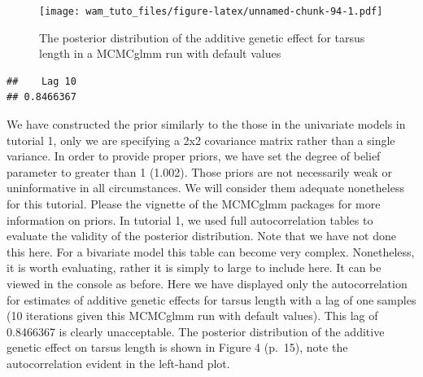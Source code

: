 \documentclass[
  12pt,
]{book}
\newenvironment{Shaded}{\begin{snugshade}}{\end{snugshade}}
\newcommand{\DecValTok}[1]{\textcolor[rgb]{0.00,0.00,0.81}{#1}}
\newcommand{\FloatTok}[1]{\textcolor[rgb]{0.00,0.00,0.81}{#1}}
\newcommand{\FunctionTok}[1]{\textcolor[rgb]{0.00,0.00,0.00}{#1}}
\newcommand{\NormalTok}[1]{#1}
\newcommand{\SpecialCharTok}[1]{\textcolor[rgb]{0.00,0.00,0.00}{#1}}
\newcommand{\StringTok}[1]{\textcolor[rgb]{0.31,0.60,0.02}{#1}}
\begin{document}
\begin{Shaded}
\end{Shaded}

\begin{figure}
\centering
\texttt{[image: wam\_tuto\_files/figure-latex/unnamed-chunk-94-1.pdf]}
\caption{\label{fig:unnamed-chunk-94}The posterior distribution of the additive genetic effect for tarsus length in a MCMCglmm run with default values}
\end{figure}

\begin{Shaded}
\end{Shaded}

\begin{verbatim}
##    Lag 10 
## 0.8466367
\end{verbatim}

We have constructed the prior similarly to the those in the univariate models in tutorial 1, only we are specifying a 2x2 covariance matrix rather than a single variance. In order to provide proper priors, we have set the degree of belief parameter to greater than 1 (1.002). Those priors are not necessarily weak or uninformative in all circumstances. We will consider them adequate nonetheless for this tutorial. Please the vignette of the MCMCglmm packages \citep{R-MCMCglmm} for more information on priors. In tutorial 1, we used full autocorrelation tables to evaluate the validity of the posterior distribution. Note that we have not done this here.
For a bivariate model this table can become very complex. Nonetheless, it is worth evaluating, rather it is simply to large to include here. It can be viewed in the console as before. Here we have displayed only the autocorrelation for estimates of additive genetic effects for tarsus length with a lag of one samples (10 iterations given this MCMCglmm run with default values). This lag of 0.8466367 is clearly unacceptable. The posterior distribution of the additive genetic effect on tarsus length is shown in Figure 4 (p.~15), note the autocorrelation evident in the left-hand plot.
\end{document}
